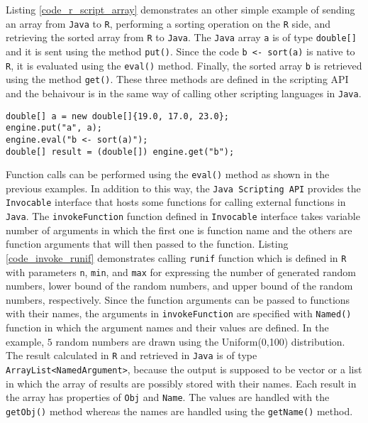 \documentclass[10pt,a4paper, final, oneside]{article}
\begin{document}
Listing \ref{code_r_script_array} demonstrates an other simple example of sending an array from \texttt{Java} to \texttt{R}, performing a sorting operation on the \texttt{R} side, and retrieving the sorted array from \texttt{R} to \texttt{Java}. The \texttt{Java} array \texttt{a} is of type \texttt{double[]} and it is sent using the method \texttt{put()}. Since the code \texttt{b <- sort(a)} is native to \texttt{R}, it is evaluated using the \texttt{eval()} method. Finally, the sorted array \texttt{b} is retrieved using the method \texttt{get()}. These three methods are defined in the scripting API and the behaivour is in the same way of calling other scripting languages in \texttt{Java}. 

\begin{minipage}{\linewidth}
\begin{lstlisting}[caption=Passing Java Arrays,label=code_r_script_array]
double[] a = new double[]{19.0, 17.0, 23.0};
engine.put("a", a);
engine.eval("b <- sort(a)");        
double[] result = (double[]) engine.get("b");
\end{lstlisting}
\end{minipage}

Function calls can be performed using the \texttt{eval()} method as shown in the previous examples. In addition to this way, the \texttt{Java Scripting API} provides the \texttt{Invocable} interface that hosts some functions for calling external functions in \texttt{Java}. The \texttt{invokeFunction} function defined in \texttt{Invocable} interface takes variable number of arguments in which the first one is function name and the others are function arguments that will then passed to the function. Listing \ref{code_invoke_runif} demonstrates calling \texttt{runif} function which is defined in \texttt{R} with parameters \texttt{n}, \texttt{min}, and \texttt{max} for expressing the number of generated random numbers, lower bound of the random numbers, and upper bound of the random numbers, respectively. Since the function arguments can be passed to functions with their names, the arguments in \texttt{invokeFunction} are specified with \texttt{Named()} function in which the argument names and their values are defined. In the example, $5$ random numbers are drawn using the Uniform(0,100) distribution. The result calculated in \texttt{R} and retrieved in \texttt{Java} is of type \texttt{ArrayList<NamedArgument>}, because the output is supposed to be vector or a list in which the array of results are possibly stored with their names. Each result in the array has properties of \texttt{Obj} and \texttt{Name}. The values are handled with the \texttt{getObj()} method whereas the names are handled using the \texttt{getName()} method.
\end{document}
